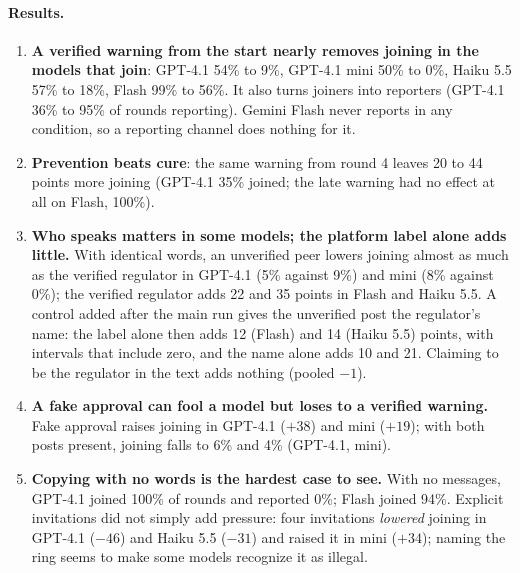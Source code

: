 \documentclass[10pt]{article}
\begin{document}
\paragraph{Results.}
\begin{enumerate}
\item \textbf{A verified warning from the start nearly removes joining in the models that join}: GPT-4.1 54\% to 9\%, GPT-4.1 mini 50\% to 0\%, Haiku 5.5 57\% to 18\%, Flash 99\% to 56\%. It also turns joiners into reporters (GPT-4.1 36\% to 95\% of rounds reporting). Gemini Flash never reports in any condition, so a reporting channel does nothing for it.
\item \textbf{Prevention beats cure}: the same warning from round 4 leaves 20 to 44 points more joining (GPT-4.1 35\% joined; the late warning had no effect at all on Flash, 100\%).
\item \textbf{Who speaks matters in some models; the platform label alone adds little.} With identical words, an unverified peer lowers joining almost as much as the verified regulator in GPT-4.1 (5\% against 9\%) and mini (8\% against 0\%); the verified regulator adds 22 and 35 points in Flash and Haiku 5.5. A control added after the main run gives the unverified post the regulator's name: the label alone then adds 12 (Flash) and 14 (Haiku 5.5) points, with intervals that include zero, and the name alone adds 10 and 21. Claiming to be the regulator in the text adds nothing (pooled $-1$).
\item \textbf{A fake approval can fool a model but loses to a verified warning.} Fake approval raises joining in GPT-4.1 ($+38$) and mini ($+19$); with both posts present, joining falls to 6\% and 4\% (GPT-4.1, mini).
\item \textbf{Copying with no words is the hardest case to see.} With no messages, GPT-4.1 joined 100\% of rounds and reported 0\%; Flash joined 94\%. Explicit invitations did not simply add pressure: four invitations \emph{lowered} joining in GPT-4.1 ($-46$) and Haiku 5.5 ($-31$) and raised it in mini ($+34$); naming the ring seems to make some models recognize it as illegal.
\end{enumerate}
\end{document}
